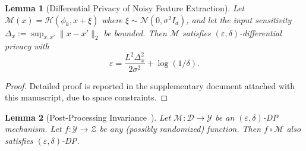 \documentclass[lettersize,journal]{IEEEtran}
\newtheorem{lemma}{Lemma}
\newtheorem{proof}{Proof}
\begin{document}
\begin{lemma}[Differential Privacy of Noisy Feature Extraction]
\label{lemma:3}
Let $\mathcal{M}(x) = \mathcal{H}(\phi_k, x + \xi)$ where $\xi \sim \mathcal{N}(0, \sigma^2 I_d)$, and let the input sensitivity $\Delta_x := \sup_{x,x'} \|x - x'\|_2$ be bounded. Then $\mathcal{M}$ satisfies $(\varepsilon, \delta)$-differential privacy with
\[
\varepsilon = \frac{L^2 \Delta_x^2}{2 \sigma^2} + \log(1/\delta).
\]
\end{lemma}

\begin{proof}
Detailed proof is reported in the supplementary document attached with this manuscript, due to space constraints.





\end{proof}

\begin{lemma}[Post-Processing Invariance~\cite{dwork2014algorithmic}]
\label{lemma:4}
Let $\mathcal{M} : \mathcal{D} \rightarrow \mathcal{Y}$ be an $(\varepsilon, \delta)$-DP mechanism. Let $f : \mathcal{Y} \rightarrow \mathcal{Z}$ be any (possibly randomized) function. Then $f \circ \mathcal{M}$ also satisfies $(\varepsilon, \delta)$-DP.
\end{lemma}
\end{document}
